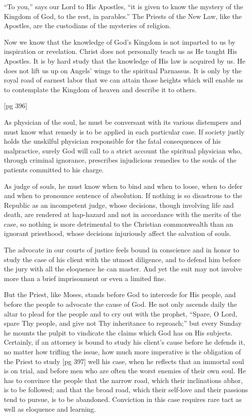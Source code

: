 “To you,” says our Lord to His Apostles, “it is
given to know the mystery of the Kingdom of God,
to the rest, in parables.” The Priests of the New
Law, like the Apostles, are the custodians of the
mysteries of religion.

Now we know that the knowledge of God's Kingdom
is not imparted to us by inspiration or revelation.
Christ does not personally teach us as He
taught His Apostles. It is by hard study that the
knowledge of His law is acquired by us. He does
not lift us up on Angels' wings to the spiritual
Parnassus. It is only by the royal road of earnest
labor that we can attain those heights which will
enable us to contemplate the Kingdom of heaven
and describe it to others.

[pg 396]

As physician of the soul, he must be conversant
with its various distempers and must know what
remedy is to be applied in each particular case. If
society justly holds the unskilful physician responsible
for the fatal consequences of his malpractice,
surely God will call to a strict account the spiritual
physician who, through criminal ignorance, prescribes
injudicious remedies to the souls of the
patients committed to his charge.

As judge of souls, he must know when to bind
and when to loose, when to defer and when to pronounce
sentence of absolution. If nothing is so
disastrous to the Republic as an incompetent
judge, whose decisions, though involving life and
death, are rendered at hap-hazard and not in accordance
with the merits of the case, so nothing is
more detrimental to the Christian commonwealth
than an ignorant priesthood, whose decisions injuriously
affect the salvation of souls.

The advocate in our courts of justice feels bound
in conscience and in honor to study the case of his
client with the utmost diligence, and to defend him
before the jury with all the eloquence he can master.
And yet the suit may not involve more than
a brief imprisonment or even a limited fine.

But the Priest, like Moses, stands before God
to intercede for His people, and before the people
to advocate the cause of God. He not only ascends
daily the altar to plead for the people and to cry
out with the prophet, “Spare, O Lord, spare Thy
people, and give not Thy inheritance to reproach;”
but every Sunday he mounts the pulpit
to vindicate the claims which God has on His
subjects. Certainly, if an attorney is bound to
study his client's cause before he defends it, no
matter how trifling the issue, how much more imperative
is the obligation of the Priest to study
[pg 397]
well his case, when he reflects that an immortal
soul is on trial, and before men who are often the
worst enemies of their own soul. He has to convince
the people that the narrow road, which their
inclinations abhor, is to be followed; and that the
broad road, which their self-love and their passions
tend to pursue, is to be abandoned. Conviction
in this case requires rare tact as well as eloquence
and learning.


